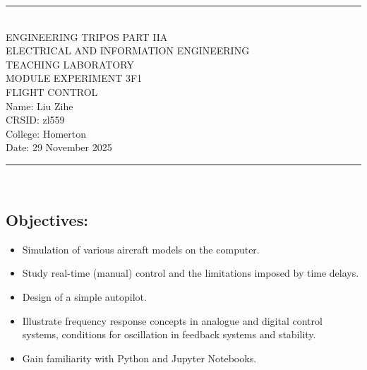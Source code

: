 \documentclass[fleqn,12pt,a4paper,twoside]{article}
\begin{document}
\setlength{\abovedisplayskip}{6pt}
\setlength{\belowdisplayskip}{6pt}

\setlength{\intextsep}{6pt}
\setlength{\floatsep}{6pt}
\setlength{\textfloatsep}{6pt}


\thispagestyle{empty}

\begin{center}
        \bfseries
        \rule{\textwidth}{.8mm} \\[.3cm]
        ENGINEERING TRIPOS PART IIA\\[1.5cm]
        ELECTRICAL AND INFORMATION ENGINEERING\\
        TEACHING LABORATORY\\[1.5cm]
        MODULE EXPERIMENT 3F1 \\[1.5cm]
        FLIGHT CONTROL\\[1.5cm]

        Name: Liu Zihe \\
        CRSID: zl559 \\
        College: Homerton \\
        Date: 29 November 2025 \\[1.5cm]
        \rule{\textwidth}{.8mm}\\[.5cm]
\end{center}
\vfill
\subsection*{Objectives:}

\begin{itemize}
        \item Simulation of various aircraft models on the computer.
        \item Study real-time (manual) control and the limitations imposed
              by time delays.
        \item Design of a simple autopilot.
        \item Illustrate frequency response concepts in analogue and digital control
              systems, conditions for oscillation in feedback systems and stability.
        \item Gain familiarity with Python and Jupyter Notebooks.
\end{itemize}
\vfill\vfill\null
\end{document}
